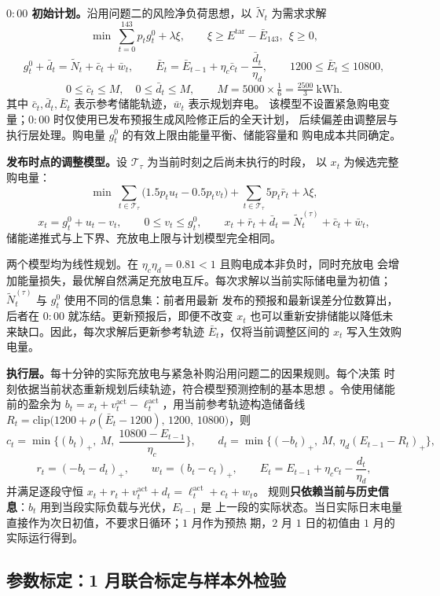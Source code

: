 \textbf{$0{:}00$ 初始计划。}沿用问题二的风险净负荷思想，以
$\widetilde N_t$ 为需求求解
$$
\min\ \sum_{t=0}^{143}p_tg_t^0+\lambda\xi ,
\qquad \xi\ge E^{\mathrm{tar}}-\bar E_{143},\ \ \xi\ge0 ,
$$
$$
g_t^0+\bar d_t=\widetilde N_t+\bar c_t+\bar w_t ,
\qquad
\bar E_t=\bar E_{t-1}+\eta_c\bar c_t-\frac{\bar d_t}{\eta_d} ,
\qquad
1200\le\bar E_t\le10800 ,
$$
$$
0\le\bar c_t\le M,\quad 0\le\bar d_t\le M ,
\qquad M=5000\times\tfrac16=\tfrac{2500}{3}\ \mathrm{kWh}.
$$
其中 $\bar c_t,\bar d_t,\bar E_t$ 表示参考储能轨迹，$\bar w_t$ 表示规划弃电。
该模型不设置紧急购电变量；$0{:}00$ 时仅使用已发布预报生成风险修正后的全天计划，
后续偏差由调整层与执行层处理。购电量 $g_t^0$ 的有效上限由能量平衡、储能容量和
购电成本共同确定。

\textbf{发布时点的调整模型。}设 $\mathcal T_\tau$ 为当前时刻之后尚未执行的时段，
以 $x_t$ 为候选完整购电量：
$$
\min\ \sum_{t\in\mathcal T_\tau}\big(1.5p_tu_t-0.5p_tv_t\big)
+\sum_{t\in\mathcal T_\tau}5p_t\bar r_t+\lambda\xi ,
$$
$$
x_t=g_t^0+u_t-v_t ,\qquad 0\le v_t\le g_t^0 ,
\qquad
x_t+\bar r_t+\bar d_t=\widetilde N_t^{(\tau)}+\bar c_t+\bar w_t ,
$$
储能递推式与上下界、充放电上限与计划模型完全相同。

两个模型均为线性规划。在 $\eta_c\eta_d=0.81<1$ 且购电成本非负时，同时充放电
会增加能量损失，最优解自然满足充放电互斥。每次求解以当前实际储电量为初值；
$\widetilde N_t^{(\tau)}$ 与 $g_t^0$ 使用不同的信息集：前者用最新
发布的预报和最新误差分位数算出，后者在 $0{:}00$ 就冻结。更新预报后，即便不改变
$x_t$ 也可以重新安排储能以降低未来缺口。因此，每次求解后更新参考轨迹
$\bar E_t$，仅将当前调整区间的 $x_t$ 写入生效购电量。

\textbf{执行层。}每十分钟的实际充放电与紧急补购沿用问题二的因果规则。每个决策
时刻依据当前状态重新规划后续轨迹，符合模型预测控制的基本思想
\cite{ref:mpc}。令使用储能前的盈余为
$b_t=x_t+v_t^{\mathrm{act}}-\ell_t^{\mathrm{act}}$，用当前参考轨迹构造储备线
$R_t=\mathrm{clip}\big(1200+\rho(\bar E_t-1200),\,1200,\,10800\big)$，则
$$
c_t=\min\Big\{(b_t)_+,\ M,\ \frac{10800-E_{t-1}}{\eta_c}\Big\},
\qquad
d_t=\min\Big\{(-b_t)_+,\ M,\ \eta_d(E_{t-1}-R_t)_+\Big\},
$$
$$
r_t=(-b_t-d_t)_+ ,\qquad w_t=(b_t-c_t)_+ ,\qquad
E_t=E_{t-1}+\eta_cc_t-\frac{d_t}{\eta_d},
$$
并满足逐段守恒 $x_t+r_t+v_t^{\mathrm{act}}+d_t=\ell_t^{\mathrm{act}}+c_t+w_t$。
规则\textbf{只依赖当前与历史信息}：$b_t$ 用到当段实际负载与光伏，$E_{t-1}$ 是
上一段的实际状态。当日实际日末电量直接作为次日初值，不要求日循环；$1$ 月作为预热
期，$2$ 月 $1$ 日的初值由 $1$ 月的实际运行得到。

\subsection{参数标定：1 月联合标定与样本外检验}

